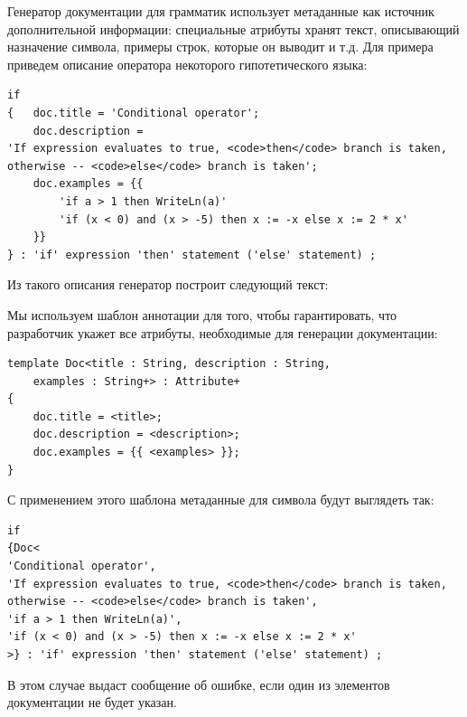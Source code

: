 Генератор документации для грамматик использует метаданные как источник дополнительной информации: специальные атрибуты хранят текст, описывающий назначение символа, примеры строк, которые он выводит и т.д. Для примера приведем описание оператора  некоторого гипотетического языка:
\begin{lstlisting}
if
{	doc.title = 'Conditional operator';
	doc.description = 
'If expression evaluates to true, <code>then</code> branch is taken,
otherwise -- <code>else</code> branch is taken';
	doc.examples = {{
		'if a > 1 then WriteLn(a)'
		'if (x < 0) and (x > -5) then x := -x else x := 2 * x'
	}}
} : 'if' expression 'then' statement ('else' statement) ;
\end{lstlisting}

Из такого описания генератор построит следующий текст:
\begin{center}
\end{center}

Мы используем шаблон аннотации для того, чтобы гарантировать, что разработчик укажет все атрибуты, необходимые для генерации документации:
\begin{lstlisting}
template Doc<title : String, description : String, 
	examples : String+> : Attribute+ 
{
	doc.title = <title>;
	doc.description = <description>;
	doc.examples = {{ <examples> }};
}
\end{lstlisting}
С применением этого шаблона метаданные для символа  будут выглядеть так:
\begin{lstlisting}
if
{Doc<
'Conditional operator',
'If expression evaluates to true, <code>then</code> branch is taken,
otherwise -- <code>else</code> branch is taken',
'if a > 1 then WriteLn(a)',
'if (x < 0) and (x > -5) then x := -x else x := 2 * x'
>} : 'if' expression 'then' statement ('else' statement) ;
\end{lstlisting}
В этом случае  выдаст сообщение об ошибке, если один из элементов документации не будет указан.

